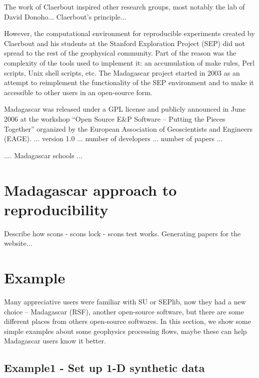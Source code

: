 The work of Claerbout inspired other research groups, most notably the
lab of David Donoho... Claerbout's principle...

However, the computational environment for reproducible experiments
created by Claerbout and his students at the Stanford Exploration
Project (SEP) did not spread to the rest of the geophysical
community. Part of the reason was the complexity of the tools used to
implement it: an accumulation of make rules, Perl scripts, Unix shell
scripts, etc. The Madagascar project started in 2003 as an attempt to
reimplement the functionality of the SEP environment and to make it
accessible to other users in an open-source form.

Madagascar was released under a GPL license and publicly announced in
June 2006 at the workshop ``Open Source E\&P Software – Putting the
Pieces Together'' organized by the European Association of
Geoscientists and Engineers (EAGE). ... version 1.0 ... number of
developers ... number of papers ... 

.... Madagascar schools ...

\section{Madagascar approach to reproducibility}

Describe how scons - scons lock - scons test works. Generating papers
for the website...

\section{Example}

Many appreciative users were familiar with SU or SEPlib,
now they had a new choice -- Madagascar (RSF), another 
open-source software, but there are some different places 
from others open-source softwares. In this section,
we show some simple examples about some geophysics processing 
flows, maybe these can help Madagascar users know
it better.

\subsection{Example1 - Set up 1-D synthetic data}


